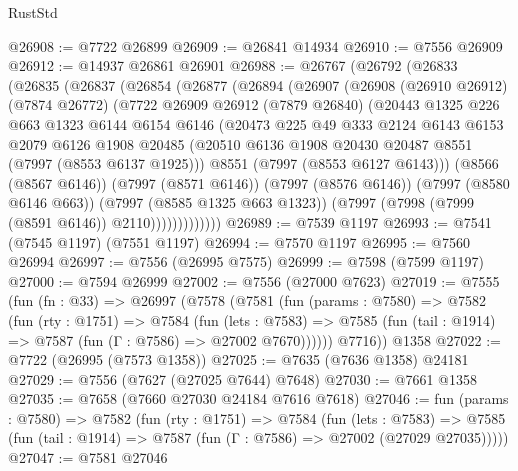 \begin{lexlean}{RustStd}
\begin{coremodule}
@26908 := @7722 @26899
@26909 := @26841 @14934
@26910 := @7556 @26909
@26912 := @14937 @26861 @26901
@26988 := @26767
    (@26792
      (@26833
        (@26835
          (@26837
            (@26854
              (@26877
                (@26894
                  (@26907
                    (@26908
                      (@26910 @26912)
                      (@7874 @26772)
                      (@7722
                        @26909
                        @26912
                        (@7879 @26840)
                        (@20443
                          @1325
                          @226
                          @663
                          @1323
                          @6144
                          @6154
                          @6146
                          (@20473
                            @225
                            @49
                            @333
                            @2124
                            @6143
                            @6153
                            @2079
                            @6126
                            @1908
                            @20485
                            (@20510 @6136 @1908 @20430 @20487 @8551 (@7997 (@8553 @6137 @1925)))
                            @8551
                            (@7997 (@8553 @6127 @6143)))
                          (@8566 (@8567 @6146))
                          (@7997 (@8571 @6146))
                          (@7997 (@8576 @6146))
                          (@7997 (@8580 @6146 @663))
                          (@7997 (@8585 @1325 @663 @1323))
                          (@7997 (@7998 (@7999 (@8591 @6146)) @2110)))))))))))))
@26989 := @7539 @1197
@26993 := @7541 (@7545 @1197) (@7551 @1197)
@26994 := @7570 @1197
@26995 := @7560 @26994
@26997 := @7556 (@26995 @7575)
@26999 := @7598 (@7599 @1197)
@27000 := @7594 @26999
@27002 := @7556 (@27000 @7623)
@27019 := @7555
    (fun (fn : @33) =>
    @26997
      (@7578
        (@7581
          (fun (params : @7580) =>
          @7582
            (fun (rty : @1751) =>
            @7584
              (fun (lets : @7583) =>
              @7585 (fun (tail : @1914) => @7587 (fun (Γ : @7586) => @27002 @7670))))))
        @7716))
    @1358
@27022 := @7722 (@26995 (@7573 @1358))
@27025 := @7635 (@7636 @1358) @24181
@27029 := @7556 (@7627 (@27025 @7644) @7648)
@27030 := @7661 @1358
@27035 := @7658 (@7660 @27030 @24184 @7616 @7618)
@27046 := fun (params : @7580) =>
  @7582
    (fun (rty : @1751) =>
    @7584
      (fun (lets : @7583) =>
      @7585 (fun (tail : @1914) => @7587 (fun (Γ : @7586) => @27002 (@27029 @27035)))))
@27047 := @7581 @27046

\end{coremodule}
\end{lexlean}
